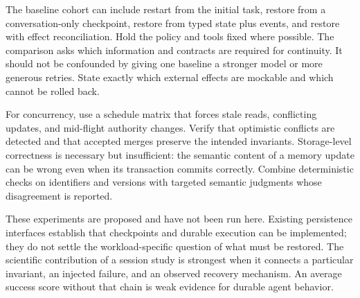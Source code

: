 The baseline cohort can include restart from the initial task, restore from a conversation-only checkpoint, restore from typed state plus events, and restore with effect reconciliation. Hold the policy and tools fixed where possible. The comparison asks which information and contracts are required for continuity. It should not be confounded by giving one baseline a stronger model or more generous retries. State exactly which external effects are mockable and which cannot be rolled back.

For concurrency, use a schedule matrix that forces stale reads, conflicting updates, and mid-flight authority changes. Verify that optimistic conflicts are detected and that accepted merges preserve the intended invariants. Storage-level correctness is necessary but insufficient: the semantic content of a memory update can be wrong even when its transaction commits correctly. Combine deterministic checks on identifiers and versions with targeted semantic judgments whose disagreement is reported.

These experiments are proposed and have not been run here. Existing persistence interfaces establish that checkpoints and durable execution can be implemented; they do not settle the workload-specific question of what must be restored. The scientific contribution of a session study is strongest when it connects a particular invariant, an injected failure, and an observed recovery mechanism. An average success score without that chain is weak evidence for durable agent behavior.

